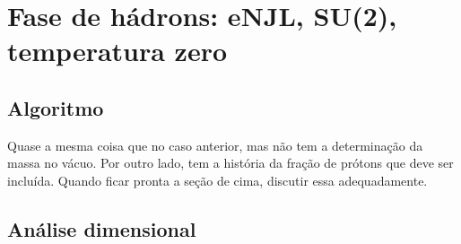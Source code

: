 
\FloatBarrier

\section{Fase de hádrons: eNJL, SU(2), temperatura zero}

\subsection{Algoritmo}

Quase a mesma coisa que no caso anterior, mas não tem a determinação da massa no vácuo. Por outro lado, tem a história da fração de prótons que deve ser incluída. Quando ficar pronta a seção de cima, discutir essa adequadamente.

\subsection{Análise dimensional}

